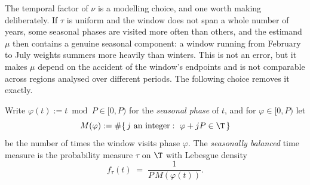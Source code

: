 The temporal factor of $\nu$ is a modelling choice, and one worth making
deliberately. If $\tau$ is uniform and the window does not span a whole
number of years, some seasonal phases are visited more often than others,
and the estimand $\mu$ then contains a genuine seasonal component: a
window running from February to July weights summers more heavily than
winters. This is not an error, but it makes $\mu$ depend on the accident
of the window's endpoints and is not comparable across regions analysed
over different periods. The following choice removes it exactly.

\begin{definition}
\label{def:tau-balanced}
Write $\varphi(t):=t\bmod P\in[0,P)$ for the \emph{seasonal phase} of
$t$, and for $\varphi\in[0,P)$ let
\[
  M(\varphi):=\#\{\,j\text{ an integer}:\ \varphi+jP\in\T\,\}
\]
be the number of times the window visits phase $\varphi$. The
\emph{seasonally balanced} time measure is the probability measure $\tau$
on $\T$ with Lebesgue density
\begin{equation}
  f_\tau(t)\;=\;\frac{1}{P\,M(\varphi(t))} .
  \label{eq:tau-balanced}
\end{equation}
\end{definition}

